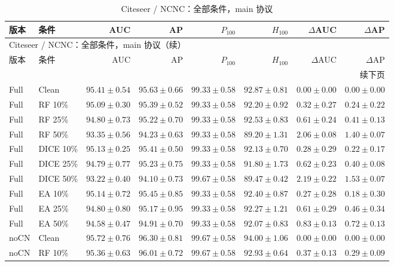 {\footnotesize
\setlength{\tabcolsep}{3.2pt}
\renewcommand{\arraystretch}{1.10}
\begin{longtable}{llrrrrrr}
\caption{Citeseer / NCNC：全部条件，main 协议}\\
\toprule
版本 & 条件 & AUC & AP & $P_{100}$ & $H_{100}$ & $\Delta$AUC & $\Delta$AP \\
\midrule
\endfirsthead
\multicolumn{8}{l}{Citeseer / NCNC：全部条件，main 协议（续）}\\
\toprule
版本 & 条件 & AUC & AP & $P_{100}$ & $H_{100}$ & $\Delta$AUC & $\Delta$AP \\
\midrule
\endhead
\midrule\multicolumn{8}{r}{续下页}\\
\endfoot
\bottomrule
\endlastfoot
Full & Clean & $95.41\pm0.54$ & $95.63\pm0.66$ & $99.33\pm0.58$ & $92.87\pm0.81$ & $0.00\pm0.00$ & $0.00\pm0.00$ \\
Full & RF 10\% & $95.09\pm0.30$ & $95.39\pm0.52$ & $99.33\pm0.58$ & $92.20\pm0.92$ & $0.32\pm0.27$ & $0.24\pm0.22$ \\
Full & RF 25\% & $94.80\pm0.73$ & $95.22\pm0.70$ & $99.33\pm0.58$ & $92.53\pm0.83$ & $0.61\pm0.24$ & $0.41\pm0.13$ \\
Full & RF 50\% & $93.35\pm0.56$ & $94.23\pm0.63$ & $99.33\pm0.58$ & $89.20\pm1.31$ & $2.06\pm0.08$ & $1.40\pm0.07$ \\
Full & DICE 10\% & $95.13\pm0.25$ & $95.41\pm0.50$ & $99.33\pm0.58$ & $92.13\pm0.70$ & $0.28\pm0.29$ & $0.22\pm0.17$ \\
Full & DICE 25\% & $94.79\pm0.77$ & $95.23\pm0.75$ & $99.33\pm0.58$ & $91.80\pm1.73$ & $0.62\pm0.23$ & $0.40\pm0.08$ \\
Full & DICE 50\% & $93.22\pm0.40$ & $94.10\pm0.73$ & $99.67\pm0.58$ & $89.47\pm0.42$ & $2.19\pm0.22$ & $1.53\pm0.07$ \\
Full & EA 10\% & $95.14\pm0.72$ & $95.45\pm0.85$ & $99.33\pm0.58$ & $92.40\pm0.87$ & $0.27\pm0.28$ & $0.18\pm0.30$ \\
Full & EA 25\% & $94.80\pm0.80$ & $95.17\pm0.95$ & $99.33\pm0.58$ & $92.27\pm1.21$ & $0.61\pm0.29$ & $0.46\pm0.34$ \\
Full & EA 50\% & $94.58\pm0.47$ & $94.91\pm0.70$ & $99.33\pm0.58$ & $92.07\pm0.83$ & $0.83\pm0.13$ & $0.72\pm0.13$ \\
noCN & Clean & $95.72\pm0.76$ & $96.30\pm0.81$ & $99.67\pm0.58$ & $94.00\pm1.06$ & $0.00\pm0.00$ & $0.00\pm0.00$ \\
noCN & RF 10\% & $95.36\pm0.63$ & $96.01\pm0.72$ & $99.67\pm0.58$ & $92.93\pm0.64$ & $0.37\pm0.13$ & $0.29\pm0.09$ \\

\end{longtable}}
